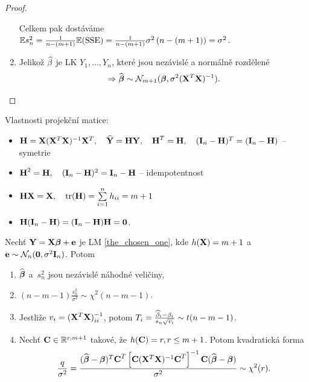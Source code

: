 \begin{proof}
\begin{enumerate}
Celkem pak dostáváme $\mathbb{E} s_n^2 = \frac{1}{n - (m + 1)} \mathbb{E} (\mathrm{SSE}) = \frac{1}{n - (m + 1)} \sigma^2\left(n - (m + 1)\right) = \sigma^2$.

\item
 Jelikož $\widehat{\beta}$ je LK $Y_1,\dots, Y_n$, které jsou nezávislé a normálně rozdělené $$\Rightarrow \widehat{\boldsymbol{\beta}} \sim \mathcal{N}_{m+1} (\boldsymbol{\beta}, \sigma^2(\mathbf{X}^T \mathbf{X})^{-1}).$$
\end{enumerate}
\end{proof}

\begin{remark}
	Vlastnosti projekční matice:
	\begin{itemize}
		\item $\textbf{H} = \mathbf{X} (\mathbf{X}^T \mathbf{X})^{-1} \mathbf{X}^T, \quad \widehat{\mathbf{Y}} = \textbf{H} \mathbf{Y}, \quad \textbf{H}^T = \textbf{H}, \quad (\textbf{I}_{n} - \textbf{H})^T = (\textbf{I}_{n} - \textbf{H})$ -- symetrie
		\item $\textbf{H}^2 = \textbf{H}, \quad (\textbf{I}_{n} - \textbf{H})^2 = \textbf{I}_{n} - \textbf{H}$ -- idempotentnost
		\item $\textbf{H} \mathbf{X} = \mathbf{X}, \quad \mathrm{tr}(\textbf{H}) = \sum\limits_{i=1}^{n} h_{ii} = m + 1$
		\item $\textbf{H}(\textbf{I}_{n} - \textbf{H}) = (\textbf{I}_{n} - \textbf{H}) \textbf{H} = \boldsymbol{0}$.
	\end{itemize}
\end{remark}

\begin{theorem}
	Nechť $\mathbf{Y} = \mathbf{X} \boldsymbol{\beta} + \mathbf{e}$ je LM \eqref{the_chosen_one}, kde $h(\mathbf{X}) = m + 1$ a~$\mathbf{e} \sim \mathcal{N}_n(\boldsymbol{0},\sigma^2 \textbf{I}_{n})$. Potom
	\begin{enumerate}
		\item $\widehat{\boldsymbol{\beta}}$ a~$s_n^2$ jsou nezávislé náhodné veličiny,
		\item $(n - m - 1) \frac{s_n^2}{\sigma^2} \sim \chi^2(n - m - 1)$.
		\item Jestliže $v_i = (\mathbf{X}^T \mathbf{X})_{ii}^{-1}$, potom $T_i = \frac{\widehat{\beta}_i - \beta_i}{s_n \sqrt{v_i}} \sim t(n-m-1)$.
		\item Nechť $\textbf{C} \in \mathbb{R}^{r,m+1}$ takové, že $h(\textbf{C}) = r, r\leq m+1$. Potom kvadratická forma
		 $$
			\frac{q}{\sigma^2} = \frac{(\widehat{\boldsymbol{\beta}} - \boldsymbol{\beta})^T \textbf{C}^T \left[\textbf{C} (\mathbf{X}^T \mathbf{X})^{-1} \textbf{C}^T \right]^{-1} \textbf{C} (\widehat{\boldsymbol{\beta}} - \boldsymbol{\beta})}{\sigma^2} \sim \chi^2(r).
		 $$
	\end{enumerate}
\end{theorem}

